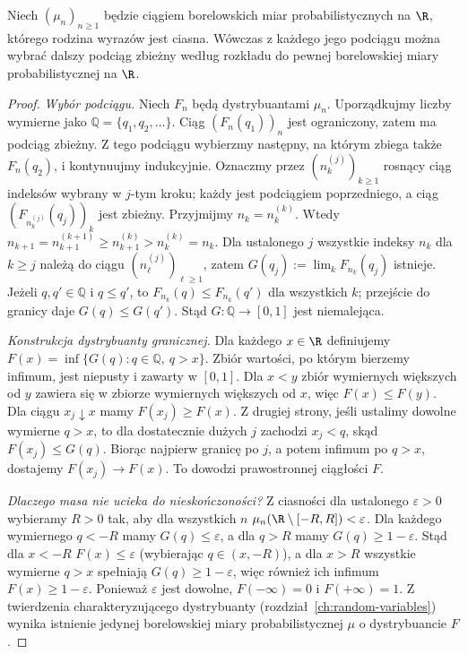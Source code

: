 \begin{lemat}
Niech $(\mu_n)_{n\geq1}$ będzie ciągiem borelowskich miar
probabilistycznych na $\R$, którego rodzina wyrazów jest ciasna.
Wówczas z każdego jego podciągu można wybrać dalszy
podciąg zbieżny według rozkładu do pewnej borelowskiej
miary probabilistycznej na $\R$.
\end{lemat}
\begin{proof}
\emph{Wybór podciągu.} Niech $F_n$ będą dystrybuantami
$\mu_n$. Uporządkujmy liczby wymierne jako
$\mathbb Q=\{q_1,q_2,\ldots\}$. Ciąg
$(F_n(q_1))_n$ jest ograniczony, zatem ma podciąg
zbieżny. Z tego podciągu wybierzmy następny, na którym
zbiega także $F_n(q_2)$, i kontynuujmy indukcyjnie.
Oznaczmy przez $(n^{(j)}_k)_{k\geq1}$ rosnący ciąg
indeksów wybrany w $j$-tym kroku; każdy jest podciągiem
poprzedniego, a ciąg $(F_{n^{(j)}_k}(q_j))_k$ jest zbieżny.
Przyjmijmy $n_k=n^{(k)}_k$. Wtedy
$n_{k+1}=n^{(k+1)}_{k+1}\geq n^{(k)}_{k+1}>n^{(k)}_k=n_k$.
Dla ustalonego $j$ wszystkie indeksy $n_k$ dla $k\geq j$
należą do ciągu $(n^{(j)}_\ell)_{\ell\geq1}$, zatem
$G(q_j):=\lim_k F_{n_k}(q_j)$ istnieje.
Jeżeli $q,q'\in\mathbb Q$ i $q\leq q'$, to
$F_{n_k}(q)\leq F_{n_k}(q')$ dla wszystkich $k$;
przejście do granicy daje $G(q)\leq G(q')$.
Stąd $G:\mathbb Q\to[0,1]$ jest niemalejąca.

\emph{Konstrukcja dystrybuanty granicznej.}
Dla każdego $x\in\R$ definiujemy
$F(x)=\inf\{G(q):q\in\mathbb Q,\ q>x\}$.
Zbiór wartości, po którym bierzemy infimum, jest
niepusty i zawarty w $[0,1]$. Dla $x<y$ zbiór
wymiernych większych od $y$ zawiera się w zbiorze
wymiernych większych od $x$, więc $F(x)\leq F(y)$.
Dla ciągu $x_j\downarrow x$ mamy $F(x_j)\geq F(x)$.
Z drugiej strony, jeśli ustalimy dowolne wymierne
$q>x$, to dla dostatecznie dużych $j$ zachodzi
$x_j<q$, skąd $F(x_j)\leq G(q)$. Biorąc najpierw
granicę po $j$, a potem infimum po $q>x$,
dostajemy $F(x_j)\to F(x)$. To dowodzi
prawostronnej ciągłości $F$.

\emph{Dlaczego masa nie ucieka do nieskończoności?}
Z ciasności dla ustalonego $\varepsilon>0$
wybieramy $R>0$ tak, aby dla wszystkich $n$
$\mu_n(\R\setminus[-R,R])<\varepsilon$.
Dla każdego wymiernego $q<-R$ mamy
$G(q)\leq\varepsilon$, a dla $q>R$ mamy
$G(q)\geq1-\varepsilon$. Stąd dla $x<-R$
$F(x)\leq\varepsilon$ (wybierając $q\in(x,-R)$),
a dla $x>R$ wszystkie wymierne $q>x$ spełniają
$G(q)\geq1-\varepsilon$, więc również ich infimum
$F(x)\geq1-\varepsilon$.
Ponieważ $\varepsilon$ jest dowolne,
$F(-\infty)=0$ i $F(+\infty)=1$.
Z twierdzenia charakteryzującego dystrybuanty
(rozdział~\ref{ch:random-variables}) wynika istnienie
jedynej borelowskiej miary probabilistycznej $\mu$
o dystrybuancie $F$.


\end{proof}
